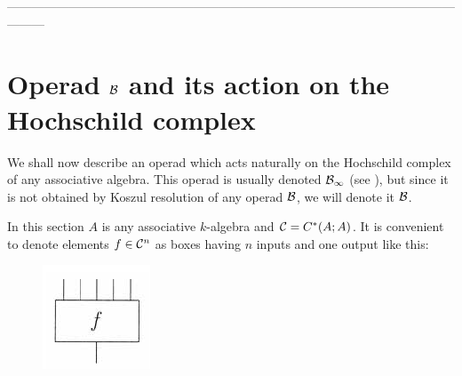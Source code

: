 \documentclass[TFM.tex]{subfiles}
\begin{document}

---------------------------------------------------------------------------------------------------------------------



\section{Operad $\mathcal{B}$ and its action on the Hochschild complex}
We shall now describe an operad which
acts naturally on the Hochschild complex of any associative algebra. This operad is
usually denoted $\mathcal{B}_\infty$ (see \cite{Hinich}), but since it is not obtained by Koszul resolution of any operad $\mathcal{B}$, we will denote it $\mathcal{B}$. 

In this section $A$ is any associative $k$-algebra and $\mathcal{C}=C^*(A;A)$.
It is convenient to denote elements $f \in \mathcal{C}^n$ as boxes having $n$ inputs and one output like
this:

\begin{figure}[h!]
\includegraphics[scale=0.9]{Imagenes//box}
\end{figure}
\end{document}
